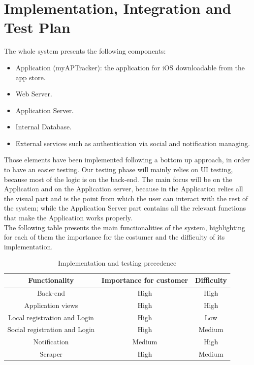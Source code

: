 \section{Implementation, Integration and Test Plan}
The whole system presents the following components:
\begin{itemize}
    \item Application (myAPTracker): the application for iOS downloadable from the app store.
    \item Web Server.
    \item Application Server.
    \item Internal Database.
    \item External services such as authentication via social and notification managing.
\end{itemize}

Those elements have been implemented following a bottom up approach, in order to have an easier testing.
Our testing phase will mainly relies on UI testing, because most of the logic is on the back-end.
The main focus will be on the Application and on the Application server, because in the Application relies all the visual part and is the point from which the user can interact with the rest of the system; while the Application Server part contains all the relevant functions that make the Application works properly.\\
The following table presents the main functionalities of the system, highlighting for each of them the importance for the costumer and the difficulty of its implementation. 

\begin{table}[h!]
    \caption{Implementation and testing precedence}
    \label{tab:implementention_testing_precedences}
    \centering
    \begin{tabular}{c|c|c}
    \rowcolor{gray!50}
    \textbf{Functionality} & \textbf{Importance for customer} & \textbf{Difficulty}\\ \hline\hline
    Back-end & High & High\\
    Application views & High & High\\
    Local registration and Login & High & Low\\
    Social registration and Login & High & Medium\\
    Notification & Medium & High\\
    Scraper & High & Medium\\\hline
    \end{tabular}
\end{table}

